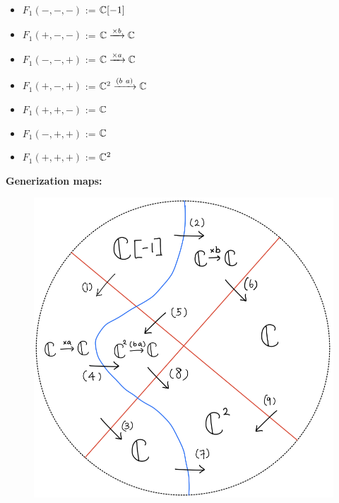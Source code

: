 \begin{itemize}
\item $F_1(-,-,-)$ := $\mathbb{C}[-1]$
\item $F_1(+,-,-)$ := $\mathbb{C} \xrightarrow{\times b} \mathbb{C} $
\item $F_1(-,-,+)$ := $\mathbb{C} \xrightarrow{\times a} \mathbb{C} $
\item $F_1(+,-,+)$ := $\mathbb{C}^2 \xrightarrow{(b ~ a)} \mathbb{C} $
\item $F_1(+,+,-)$ := $\mathbb{C}$
\item $F_1(-,+,+)$ := $\mathbb{C}$
\item $F_1(+,+,+)$ := $\mathbb{C}^2$
\end{itemize}
\textbf{Generization maps:}
\begin{figure}[H]
    \centering
    \includegraphics[scale = 0.45]{diagrams/lemma4/33.png}
    \caption{}
    \label{fig:your-label}
\end{figure}
